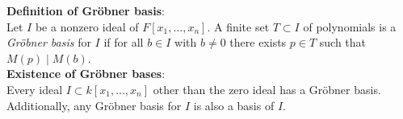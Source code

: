 \documentclass[12pt]{article}
\begin{document}
{\bf Definition of Gr\"obner basis}:\\
Let $I$ be a nonzero ideal of $F[x_1,\ldots,x_n]$.  A finite set $T \subset I$ of polynomials is a {\em Gr\"obner basis} for $I$ if for all $b \in I$ with $b \neq 0$ there exists $p \in T$ such that $M(p) \mid M(b)$.\\

{\bf Existence of Gr\"obner bases}:\\
Every ideal $I \subset k[x_1,\ldots,x_n]$ other than the zero ideal has a Gr\"obner basis.  Additionally, any Gr\"obner basis for $I$ is also a basis of $I$.
\end{document}
